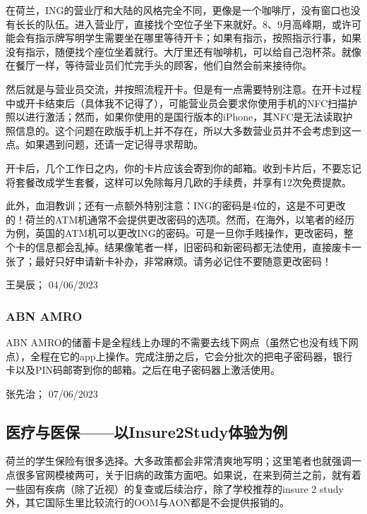 在荷兰，ING的营业厅和大陆的风格完全不同，更像是一个咖啡厅，没有窗口也没有长长的队伍。进入营业厅，直接找个空位子坐下来就好。8、9月高峰期，或许可能会有指示牌写明学生需要坐在哪里等待开卡；如果有指示，按照指示行事，如果没有指示，随便找个座位坐着就行。大厅里还有咖啡机，可以给自己泡杯茶。就像在餐厅一样，等待营业员们忙完手头的顾客，他们自然会前来接待你。

然后就是与营业员交流，并按照流程开卡。但是有一点需要特别注意。在开卡过程中或开卡结束后（具体我不记得了），可能营业员会要求你使用手机的NFC扫描护照以进行激活；然而，如果你使用的是国行版本的iPhone，其NFC是无法读取护照信息的。这个问题在欧版手机上并不存在，所以大多数营业员并不会考虑到这一点。如果遇到问题，还请一定记得寻求帮助。

开卡后，几个工作日之内，你的卡片应该会寄到你的邮箱。收到卡片后，不要忘记将套餐改成学生套餐，这样可以免除每月几欧的手续费，并享有12次免费提款。

此外，血泪教训；还有一点额外特别注意：ING的密码是4位的，这是不可更改的！荷兰的ATM机通常不会提供更改密码的选项。然而，在海外，以笔者的经历为例，英国的ATM机可以更改ING的密码。可是一旦你手贱操作，更改密码，整个卡的信息都会乱掉。结果像笔者一样，旧密码和新密码都无法使用，直接废卡一张了；最好只好申请新卡补办，非常麻烦。请务必记住不要随意更改密码！
\begin{flushright}
王昊辰； 04/06/2023
\end{flushright}
\subsubsection{ABN AMRO}
ABN AMRO的储蓄卡是全程线上办理的不需要去线下网点（虽然它也没有线下网点），全程在它的app上操作。完成注册之后，它会分批次的把电子密码器，银行卡以及PIN码邮寄到你的邮箱。之后在电子密码器上激活使用。
\begin{flushright}
张先治； 07/06/2023

\end{flushright}


\vspace{\betsubsec} %
\subsection{医疗与医保——以Insure2Study体验为例}
荷兰的学生保险有很多选择。大多政策都会非常清爽地写明；这里笔者也就强调一点很多官网模棱两可，关于旧病的政策方面吧。如果说，在来到荷兰之前，就有着一些固有疾病（除了近视）的复查或后续治疗，除了学校推荐的insure 2 study外，其它国际生里比较流行的OOM与AON都是不会提供报销的。

